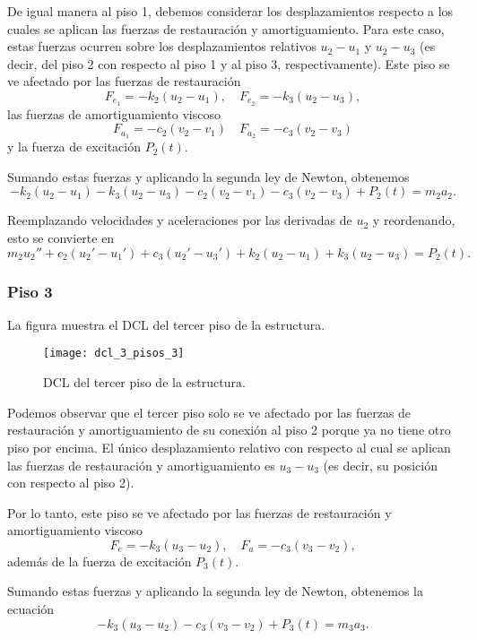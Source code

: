 De igual manera al piso 1, debemos considerar los desplazamientos respecto a los cuales se aplican las fuerzas de restauración y amortiguamiento. Para este caso, estas fuerzas ocurren sobre los desplazamientos relativos \(u_2 - u_1\) y \(u_2 - u_3\) (es decir, del piso 2 con respecto al piso 1 y al piso 3, respectivamente). Este piso se ve afectado por las fuerzas de restauración
\[
    F_{e_1} = -k_2(u_2 - u_1), \quad F_{e_2} = -k_3(u_2 - u_3)
,\]
las fuerzas de amortiguamiento viscoso
\[
    F_{a_1} = -c_2(v_2 - v_1) \quad F_{a_2} = -c_3(v_2 - v_3)
\]
y la fuerza de excitación \(P_2(t)\).

Sumando estas fuerzas y aplicando la segunda ley de Newton, obtenemos
\[
    -k_2(u_2 - u_1) - k_3(u_2 - u_3) - c_2(v_2 - v_1) - c_3(v_2 - v_3) + P_2(t) = m_2 a_2
.\]

Reemplazando velocidades y aceleraciones por las derivadas de \(u_2\) y reordenando, esto se convierte en
\begin{equation}\label{eqn:floor-2}
    m_2 u_2'' + c_2(u_2' - u_1') + c_3(u_2' - u_3') + k_2(u_2 - u_1) + k_3(u_2 - u_3) = P_2(t)
.\end{equation}


\subsubsection*{Piso 3}

La figura  muestra el DCL del tercer piso de la estructura.

\begin{figure}[ht!]
    \centering
    \texttt{[image: dcl\_3\_pisos\_3]}
    \caption{DCL del tercer piso de la estructura.}
    \label{fig:3-floor-dcl-3}
\end{figure}


Podemos observar que el tercer piso solo se ve afectado por las fuerzas de restauración y amortiguamiento de su conexión al piso 2 porque ya no tiene otro piso por encima. El único desplazamiento relativo con respecto al cual se aplican las fuerzas de restauración y amortiguamiento es \(u_3 - u_3\) (es decir, su posición con respecto al piso 2).

Por lo tanto, este piso se ve afectado por las fuerzas de restauración y amortiguamiento viscoso
\[
    F_e = -k_3(u_3 - u_2), \quad F_a = -c_3(v_3 - v_2)
,\]
además de la fuerza de excitación \(P_3(t)\).

Sumando estas fuerzas y aplicando la segunda ley de Newton, obtenemos la ecuación
\[
    -k_3(u_3 - u_2) - c_3(v_3 - v_2) + P_3(t) = m_3 a_3
.\]

